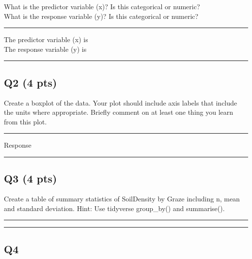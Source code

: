 \documentclass[
]{article}
\begin{document}
What is the predictor variable (x)? Is this categorical or numeric?\\
What is the response variable (y)? Is this categorical or numeric?

\begin{center}\rule{0.5\linewidth}{0.5pt}\end{center}

The predictor variable (x) is\\
The response variable (y) is

\begin{center}\rule{0.5\linewidth}{0.5pt}\end{center}

\hypertarget{q2-4-pts}{%
\subsection{Q2 (4 pts)}\label{q2-4-pts}}

Create a boxplot of the data. Your plot should include axis labels that
include the units where appropriate. Briefly comment on at least one
thing you learn from this plot.

\begin{center}\rule{0.5\linewidth}{0.5pt}\end{center}

Response

\begin{center}\rule{0.5\linewidth}{0.5pt}\end{center}

\hypertarget{q3-4-pts}{%
\subsection{Q3 (4 pts)}\label{q3-4-pts}}

Create a table of summary statistics of SoilDensity by Graze including
n, mean and standard deviation. Hint: Use tidyverse group\_by() and
summarise().

\begin{center}\rule{0.5\linewidth}{0.5pt}\end{center}

\begin{center}\rule{0.5\linewidth}{0.5pt}\end{center}

\hypertarget{q4}{%
\subsection{Q4}\label{q4}}
\end{document}
